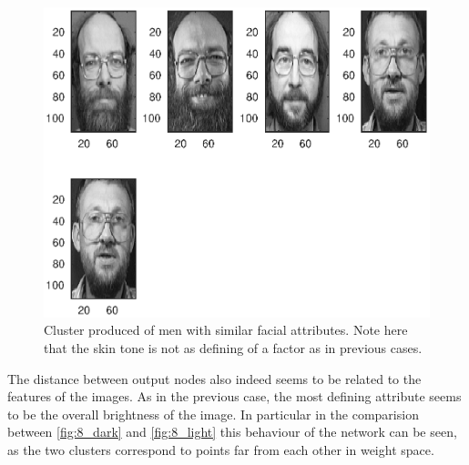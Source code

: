 \documentclass[a4paper,12pt]{article}
\theoremstyle{plain}
\theoremstyle{definition}
\begin{document}
      \begin{figure}[H]
         \centering
         \includegraphics[scale=.6]{7_beardandglasses}
         \caption{Cluster produced of men with similar facial attributes. Note
         here that the skin tone is not as defining of a factor as in previous
         cases.}
         \label{fig:7_beardandglasses}
      \end{figure}

      The distance between output nodes also indeed seems to be related to the
      features of the images. As in the previous case, the most defining
      attribute seems to be the overall brightness of the image. In particular in
      the comparision between \cref{fig:8_dark} and \cref{fig:8_light} this behaviour 
      of the network can be seen, as the two clusters
      correspond to points far from each other in weight space. 
      
\end{document}
